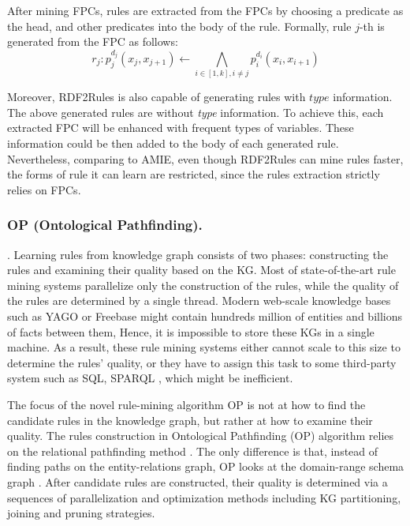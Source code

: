 After mining FPCs, rules are extracted from the FPCs by choosing a predicate as the head, and other predicates into the body of the rule. Formally, rule $j$-th is generated from the FPC as follows:
\[r_j: p_j^{d_j}(x_j,x_{j+1}) \leftarrow \underset{i \in [1,k], i \ne j}{\bigwedge} p_i^{d_i}(x_i,x_{i+1}) \]

Moreover, RDF2Rules is also capable of generating rules with $type$ information. The above generated rules are without \textit{type} information. To achieve this, each extracted FPC will be enhanced with frequent types of variables. These information could be then added to the body of each generated rule. Nevertheless, comparing to AMIE, even though RDF2Rules can mine rules faster, the forms of rule it can learn are restricted, since the rules extraction strictly relies on FPCs.

\subsubsection{OP (Ontological Pathfinding).}
.
Learning rules from knowledge graph consists of two phases: constructing the rules and examining their quality based on the KG. Most of state-of-the-art rule mining systems parallelize only the construction of the rules, while the quality of the rules are determined by a single thread.
Modern web-scale knowledge bases such as YAGO or Freebase might contain hundreds million of entities and billions of facts between them, Hence, it is impossible to store these KGs in a single machine. As a result, these rule mining systems either cannot scale to this size to determine the rules' quality, or they have to assign this task to some third-party system such as SQL, SPARQL \cite{amie}, which might be inefficient.

The focus of the novel rule-mining algorithm OP\cite{op} is not at how to find the candidate rules in the knowledge graph, but rather at how to examine their quality. The rules construction in Ontological Pathfinding (OP) algorithm relies on the relational pathfinding method \cite{DBLP:conf/aaai/RichardsM92}. The only difference is that, instead of finding paths on the entity-relations graph, OP looks at the domain-range schema graph \cite{op}. After candidate rules are constructed, their quality is determined via a sequences of parallelization and optimization methods including KG partitioning, joining and pruning strategies. 
